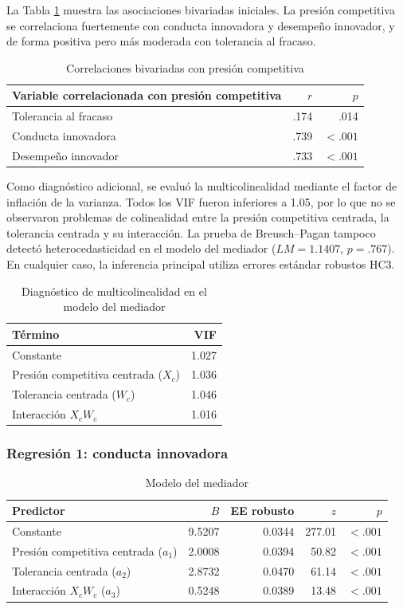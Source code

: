 \documentclass[12pt,letterpaper]{article}
\begin{document}
La Tabla \ref{tab:p1-correlaciones} muestra las asociaciones bivariadas iniciales. La presión competitiva se correlaciona fuertemente con conducta innovadora y desempeño innovador, y de forma positiva pero más moderada con tolerancia al fracaso.

\begin{table}[H]
\centering
\caption{Correlaciones bivariadas con presión competitiva}
\label{tab:p1-correlaciones}
\begin{tabular}{lrr}
\toprule
Variable correlacionada con presión competitiva & $r$ & $p$ \\
\midrule
Tolerancia al fracaso & .174 & .014 \\
Conducta innovadora & .739 & $<.001$ \\
Desempeño innovador & .733 & $<.001$ \\
\bottomrule
\end{tabular}
\end{table}

Como diagnóstico adicional, se evaluó la multicolinealidad mediante el factor de inflación de la varianza. Todos los VIF fueron inferiores a 1.05, por lo que no se observaron problemas de colinealidad entre la presión competitiva centrada, la tolerancia centrada y su interacción. La prueba de Breusch--Pagan tampoco detectó heterocedasticidad en el modelo del mediador ($LM=1.1407$, $p=.767$). En cualquier caso, la inferencia principal utiliza errores estándar robustos HC3.


\begin{table}[H]
\centering
\caption{Diagnóstico de multicolinealidad en el modelo del mediador}
\label{tab:p1-vif}
\begin{tabular}{lr}
\toprule
Término & VIF \\
\midrule
Constante & 1.027 \\
Presión competitiva centrada ($X_c$) & 1.036 \\
Tolerancia centrada ($W_c$) & 1.046 \\
Interacción $X_cW_c$ & 1.016 \\
\bottomrule
\end{tabular}
\end{table}

\subsubsection{Regresión 1: conducta innovadora}

\begin{table}[H]
\centering
\caption{Modelo del mediador}
\begin{tabular}{lrrrr}
\toprule
Predictor & $B$ & EE robusto & $z$ & $p$ \\
\midrule
Constante & 9.5207 & 0.0344 & 277.01 & $<.001$ \\
Presión competitiva centrada ($a_1$) & 2.0008 & 0.0394 & 50.82 & $<.001$ \\
Tolerancia centrada ($a_2$) & 2.8732 & 0.0470 & 61.14 & $<.001$ \\
Interacción $X_cW_c$ ($a_3$) & 0.5248 & 0.0389 & 13.48 & $<.001$ \\
\bottomrule
\end{tabular}
\end{table}
\end{document}
